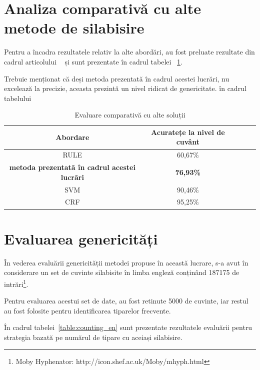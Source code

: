 \newpage
\section{Analiza comparativă cu alte metode de silabisire}

Pentru a încadra rezultatele relativ la alte abordări, au fost preluate rezultate din cadrul articolului ~\cite{bib:dinu2013romanian} și sunt prezentate în cadrul tabelei ~\ref{table:comparison}. 

Trebuie menționat că deși metoda prezentată în cadrul acestei lucrări, nu excelează la precizie, aceasta prezintă un nivel ridicat de genericitate. în cadrul tabelului 

\begin{table}[h!]
\centering
\begin{tabular}{|c|c|c|c|c|}
\hline
Abordare & Acuratețe la nivel de cuvânt\\  
\hline
\hline
RULE & 60,67\%\\ 
\hline
 \textbf{metoda prezentată în cadrul acestei lucrări} & \textbf{76,93\%} \\ 
\hline
SVM & 90,46\%\\ 
\hline
CRF & 95,25\%\\ 
\hline\end{tabular}
\caption{Evaluare comparativă cu alte soluții} 
\label{table:comparison}
\end{table}

\section{Evaluarea genericități}

În vederea evaluării genericității metodei propuse în această lucrare, s-a avut în considerare un set de cuvinte silabisite în limba engleză conținând 187175 de intrări\footnote{Moby Hyphenator: http://icon.shef.ac.uk/Moby/mhyph.html}. 

Pentru evaluarea acestui set de date, au fost retinute 5000 de cuvinte, iar restul au fost folosite pentru identificarea tiparelor frecvente. 

În cadrul tabelei~\ref{table:counting_en} sunt prezentate rezultatele evaluării pentru strategia bazată pe numărul de tipare cu aceiași silabisire.

